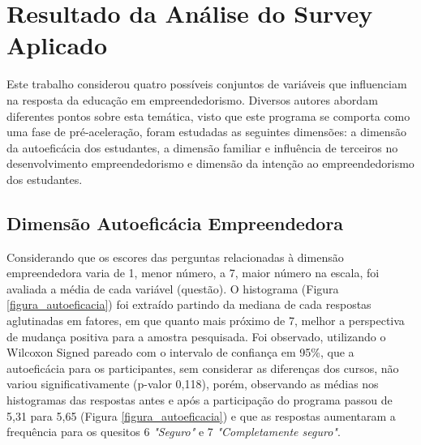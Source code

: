 \section{Resultado da Análise do Survey Aplicado}

Este trabalho considerou quatro possíveis conjuntos de variáveis que influenciam na resposta da educação em empreendedorismo. Diversos autores abordam diferentes pontos sobre esta temática, visto que este programa se comporta como uma fase de pré-aceleração, foram estudadas as seguintes dimensões: a dimensão da autoeficácia dos estudantes,  a dimensão familiar e influência de terceiros no desenvolvimento empreendedorismo e dimensão da intenção  ao empreendedorismo dos estudantes.






\subsection{Dimensão Autoeficácia Empreendedora}

Considerando que os escores das perguntas relacionadas à dimensão empreendedora varia de 1, menor número, a 7, maior número na escala, foi avaliada a média de cada variável (questão). O histograma (Figura \ref{figura_autoeficacia}) foi extraído partindo da mediana de cada respostas aglutinadas em fatores, em que quanto mais próximo de 7, melhor a perspectiva de mudança positiva para a amostra pesquisada. Foi observado, utilizando o Wilcoxon Signed pareado com o intervalo de confiança em 95\%, que a autoeficácia para os participantes, sem considerar as diferenças dos cursos, não variou significativamente (p-valor 0,118), porém, observando as médias nos histogramas das respostas antes e após a participação do programa passou de 5,31 para 5,65 (Figura \ref{figura_autoeficacia}) e que as respostas aumentaram a frequência para os quesitos 6 \textit{"Seguro"} e 7 \textit{"Completamente seguro"}.

